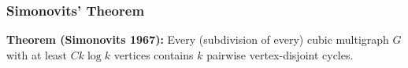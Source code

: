 \documentclass{beamer}
\begin{document}
\begin{frame}
  \frametitle{Simonovits' Theorem}

  \noindent\textbf{Theorem (Simonovits 1967):} Every (subdivision of every) cubic multigraph $G$ with at least $C k\log k$ vertices contains $k$ pairwise vertex-disjoint cycles.


\end{frame}
\end{document}
